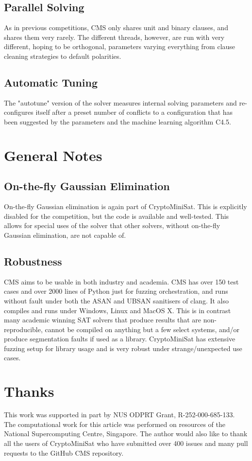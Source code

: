 \documentclass[final]{ieee}
\begin{document}
\subsection{Parallel Solving}
As in previous competitions, CMS only shares unit and binary clauses, and shares them very rarely. The different threads, however, are run with very different, hoping to be orthogonal, parameters varying everything from clause cleaning strategies to default polarities.

\subsection{Automatic Tuning}
The "autotune" version of the solver measures internal solving parameters and re-configures itself after a preset number of conflicts to a configuration that has been suggested by the parameters and the machine learning algorithm C4.5\cite{Salzberg1994}.

\section{General Notes}
\subsection{On-the-fly Gaussian Elimination}
On-the-fly Gaussian elimination is again part of CryptoMiniSat. This is explicitly disabled for the competition, but the code is available and well-tested. This allows for special uses of the solver that other solvers, without on-the-fly Gaussian elimination, are not capable of.

\subsection{Robustness}
CMS aims to be usable in both industry and academia. CMS has over 150 test cases and over 2000 lines of Python just for fuzzing orchestration, and runs without fault under both the ASAN and UBSAN sanitisers of clang. It also compiles and runs under Windows, Linux and MacOS X. This is in contrast many academic winning SAT solvers that produce results that are non-reproducible, cannot be compiled on anything but a few select systems, and/or produce segmentation faults if used as a library. CryptoMiniSat has extensive fuzzing setup for library usage and is very robust under strange/unexpected use cases.

\section{Thanks}
This work was supported in part by NUS ODPRT Grant, R-252-000-685-133. The computational work for this article was performed on resources of the National Supercomputing Centre, Singapore\cite{nscc}. The author would also like to thank all the users of CryptoMiniSat who have submitted over 400 issues and many pull requests to the GitHub CMS repository\cite{CMS}.





\vfill
\pagebreak
\end{document}
